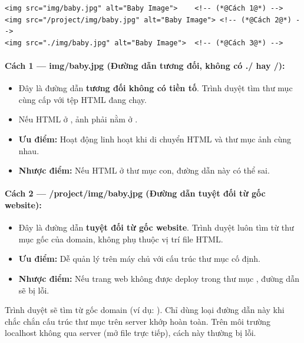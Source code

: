 \begin{codeWindow}
\begin{lstlisting}[language=HTML5]
<img src="img/baby.jpg" alt="Baby Image">    <!-- (*@Cách 1@*) -->
<img src="/project/img/baby.jpg" alt="Baby Image"> <!-- (*@Cách 2@*) -->
<img src="./img/baby.jpg" alt="Baby Image">  <!-- (*@Cách 3@*) -->
\end{lstlisting}
\end{codeWindow}

\paragraph{Cách 1 — img/baby.jpg (Đường dẫn tương đối, không có ./ hay /):}
\begin{itemize}[leftmargin=1.5em, itemsep=2pt, parsep=0pt]
    \item Đây là đường dẫn \textbf{tương đối không có tiền tố}. Trình duyệt tìm thư mục  cùng cấp với tệp HTML đang chạy.
    \item Nếu HTML ở , ảnh phải nằm ở .
    \item \textbf{Ưu điểm:} Hoạt động linh hoạt khi di chuyển HTML và thư mục ảnh cùng nhau.
    \item \textbf{Nhược điểm:} Nếu HTML ở thư mục con, đường dẫn này có thể sai.
\end{itemize}

\paragraph{Cách 2 — /project/img/baby.jpg (Đường dẫn tuyệt đối từ gốc website):}
\begin{itemize}[leftmargin=1.5em, itemsep=2pt, parsep=0pt]
    \item Đây là đường dẫn \textbf{tuyệt đối từ gốc website}. Trình duyệt luôn tìm từ thư mục gốc của domain, không phụ thuộc vị trí file HTML.
    \item \textbf{Ưu điểm:} Dễ quản lý trên máy chủ với cấu trúc thư mục cố định.
    \item \textbf{Nhược điểm:} Nếu trang web không được deploy trong thư mục , đường dẫn sẽ bị lỗi.
\end{itemize}

\begin{warnBox}
Trình duyệt sẽ tìm  từ gốc domain (ví dụ: ). Chỉ dùng loại đường dẫn này khi chắc chắn cấu trúc thư mục trên server khớp hoàn toàn. Trên môi trường localhost không qua server (mở file trực tiếp), cách này thường bị lỗi.
\end{warnBox}

